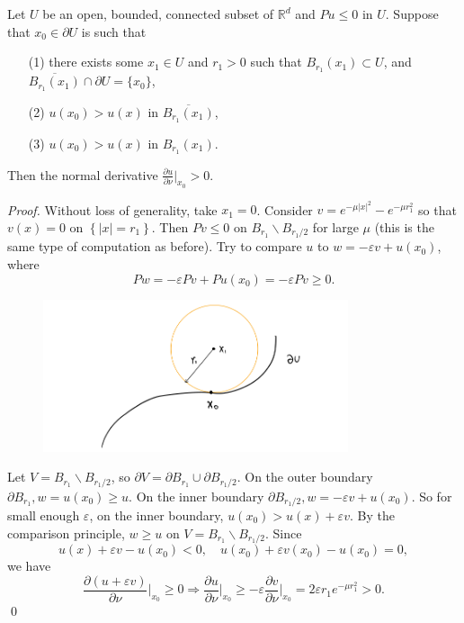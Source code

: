 \begin{theorem}
 Let $U$ be an open, bounded, connected subset of $\mathbb{R}^{d}$ and $Pu\le 0$ in $U$. Suppose that $x_{0} \in \partial U$ is such that
 \begin{itemize}
     \item [(1)] there exists some $x_1\in U$ and $r_1>0$ such that $B_{r_1}(x_1) \subset U$, and $\overline{B_{r_1}(x_1)}\cap\partial U = \{x_0\}$,
     \item [(2)] $u(x_0)> u(x)$ in $\overline{B_{r_1}(x_1)}$, 
     \item [(3)] $u(x_0)> u(x)$ in $B_{r_1}(x_1)$. 
 \end{itemize}
 Then the normal derivative $\frac{\partial u}{\partial \nu}|_{x_0} >0$. 
\end{theorem}
\begin{proof}
Without loss of generality, take $x_{1}=0$. Consider $v=e^{-\mu|x|^{2}} - e^{-\mu r_1^2}$ so that $v(x)=0$ on $\left\{|x|=r_{1}\right\}$. Then $P v \le 0$ on $B_{r_{1}} \backslash B_{r_{1} / 2}$ for large $\mu$ (this is the same type of computation as before). Try to compare $u$ to $w=-\varepsilon v+u\left(x_{0}\right)$, where
$$
P w=-\varepsilon P v+P u\left(x_{0}\right)= -\varepsilon P v \geq 0 .
$$
\begin{figure}[H]
    \centering
    \includegraphics[width=0.8\textwidth]{figures/12-Hopf.png}
\end{figure}
Let $V=B_{r_{1}} \backslash B_{r_{1} / 2}$, so $\partial V=\partial B_{r_{1}} \cup \partial B_{r_{1} / 2}$. On the outer boundary $\partial B_{r_{1}}, w=u\left(x_{0}\right) \geq u$. On the inner boundary $\partial B_{r_{1} / 2}, w=-\varepsilon v+u\left(x_{0}\right)$. So for small enough $\varepsilon$, on the inner boundary, $u\left(x_{0}\right)>u(x)+\varepsilon v$. By the comparison principle, $w \geq u$ on $V=B_{r_{1}} \backslash B_{r_{1} / 2}$. Since 
\[
    u(x) + \varepsilon v - u(x_0)<0 , \quad u(x_0) + \varepsilon v(x_0) - u(x_0) = 0,
\]
we have 
\[
    \frac{\partial(u + \varepsilon v)}{\partial \nu}\Bigg|_{x_0} \ge 0 \Rightarrow  \frac{\partial u}{\partial \nu} \Bigg |_{x_0}\ge -\varepsilon \frac{\partial v}{\partial \nu} \Bigg|_{x_0} = 2\varepsilon r_1 e^{-\mu r_1^2}>0.
\]
\qed
\end{proof}


